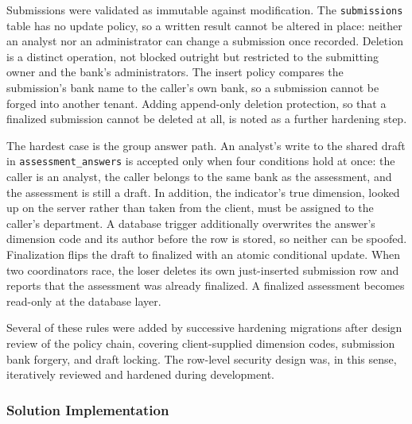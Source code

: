 \begin{sloppypar}
Submissions were validated as immutable against modification. The \texttt{submissions} table has no update policy, so a written result cannot be altered in place: neither an analyst nor an administrator can change a submission once recorded. Deletion is a distinct operation, not blocked outright but restricted to the submitting owner and the bank's administrators. The insert policy compares the submission's bank name to the caller's own bank, so a submission cannot be forged into another tenant. Adding append-only deletion protection, so that a finalized submission cannot be deleted at all, is noted as a further hardening step.
\end{sloppypar}

\begin{sloppypar}
The hardest case is the group answer path. An analyst's write to the shared draft in \texttt{assessment\_answers} is accepted only when four conditions hold at once: the caller is an analyst, the caller belongs to the same bank as the assessment, and the assessment is still a draft. In addition, the indicator's true dimension, looked up on the server rather than taken from the client, must be assigned to the caller's department. A database trigger additionally overwrites the answer's dimension code and its author before the row is stored, so neither can be spoofed. Finalization flips the draft to finalized with an atomic conditional update. When two coordinators race, the loser deletes its own just-inserted submission row and reports that the assessment was already finalized. A finalized assessment becomes read-only at the database layer.
\end{sloppypar}

Several of these rules were added by successive hardening migrations after design review of the policy chain, covering client-supplied dimension codes, submission bank forgery, and draft locking. The row-level security design was, in this sense, iteratively reviewed and hardened during development.

\subsubsection{Solution Implementation}

